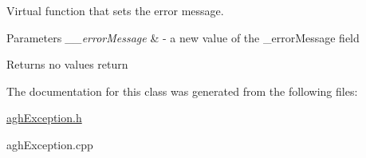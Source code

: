 \-Virtual function that sets the error message. 


\begin{DoxyParams}{\-Parameters}
{\em \-\_\-\-\_\-error\-Message} & -\/ a new value of the \-\_\-error\-Message field \\
\hline
\end{DoxyParams}
\begin{DoxyReturn}{\-Returns}
no values return 
\end{DoxyReturn}


\-The documentation for this class was generated from the following files\-:\begin{DoxyCompactItemize}
\item 
\hyperlink{aghException_8h}{agh\-Exception.\-h}\item 
agh\-Exception.\-cpp\end{DoxyCompactItemize}
